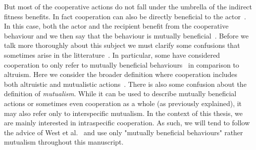     But most of the cooperative actions do not fall under the umbrella of the indirect fitness benefits. In fact cooperation can also be directly beneficial to the actor~\parencite{Leimar2010}. In this case, both the actor and the recipient benefit from the cooperative behaviour and we then say that the behaviour is mutually beneficial~\parencite{West2007a}. Before we talk more thoroughly about this subject we must clarify some confusions that sometimes arise in the litterature~\parencite{Bergmuller2007a}. In particular, some have considered cooperation to only refer to mutually beneficial behaviours~\parencite{Trivers1985, Lehmann2006} in comparison to altruism. Here we consider the broader definition where cooperation includes both altruistic and mutualistic actions~\parencite{West2007a}. There is also some confusion about the definition of \emph{mutualism}. While it can be used to describe mutually beneficial actions or sometimes even cooperation as a whole (as previously explained), it may also refer only to interspecific mutualism. In the context of this thesis, we are mainly interested in intraspecific cooperation. As such, we will tend to follow the advice of West et al.~\parencite{West2007} and use only "mutually beneficial behaviours" rather mutualism throughout this manuscript.

